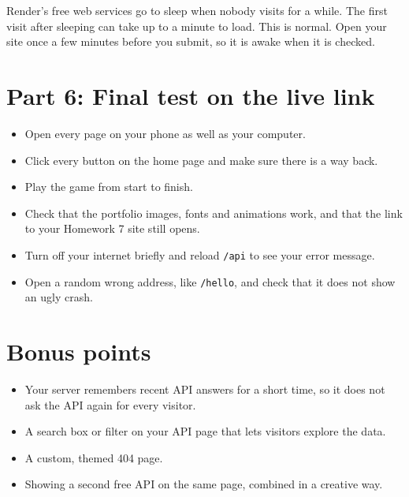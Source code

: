 \documentclass[11pt,a4paper]{article}
\begin{document}
\begin{note}
Render's free web services go to sleep when nobody visits for a while. The first visit after sleeping can take up to a minute to load. This is normal. Open your site once a few minutes before you submit, so it is awake when it is checked.
\end{note}

\section{Part 6: Final test on the live link}
\begin{itemize}
\item Open every page on your phone as well as your computer.
\item Click every button on the home page and make sure there is a way back.
\item Play the game from start to finish.
\item Check that the portfolio images, fonts and animations work, and that the link to your Homework 7 site still opens.
\item Turn off your internet briefly and reload \texttt{/api} to see your error message.
\item Open a random wrong address, like \texttt{/hello}, and check that it does not show an ugly crash.
\end{itemize}

\section{Bonus points}
\begin{itemize}
\item Your server remembers recent API answers for a short time, so it does not ask the API again for every visitor.
\item A search box or filter on your API page that lets visitors explore the data.
\item A custom, themed 404 page.
\item Showing a second free API on the same page, combined in a creative way.
\end{itemize}
\end{document}
